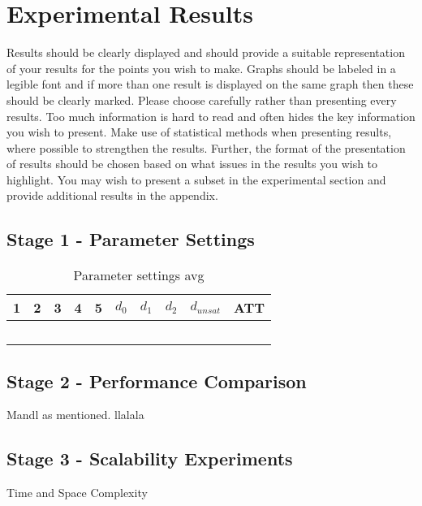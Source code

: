 \section{Experimental Results}

Results should be clearly displayed and should provide a suitable representation of your results for the points you wish to make. Graphs should be labeled in a legible font and if more than one result is displayed on the same graph then these should be clearly marked.   Please choose carefully rather than presenting every results. Too much information is hard to read and often hides the key information you wish to present. Make use of statistical methods when presenting results, where possible to strengthen the results.  Further, the format of the presentation of results should be chosen based on what issues in the results you wish to highlight. You may wish to present a subset in the experimental section and provide additional results in the appendix.

\subsection{Stage 1 - Parameter Settings}

\begin{table}[H]
\centering
    \begin{tabular}{|l|l|l|l|l||l|l|l|l|l|}

 	\hline
 	1 & 2 & 3 & 4 & 5 & $d_0$ & $d_1$ & $d_2$ & $d_{unsat}$ & ATT \\
 	\hline
    ~ & ~ & ~ & ~ & ~ & ~ & ~ & ~ & ~ & ~ \\

	\hline
    \end{tabular}
    \caption {Parameter settings avg}
    \label{table:parameterSettings}

\end{table}

\subsection{Stage 2 - Performance Comparison}

Mandl as mentioned. llalala

\subsection{Stage 3 -  Scalability Experiments}
Time and Space Complexity